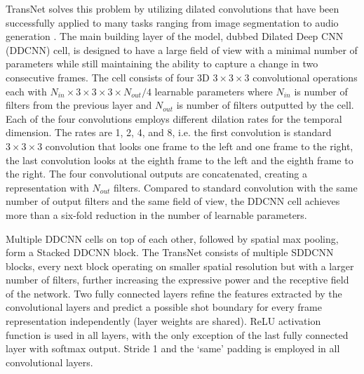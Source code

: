 TransNet solves this problem by utilizing dilated convolutions that have been successfully applied to many tasks ranging from image segmentation \cite{yu2015multi} to audio generation \cite{WaveNet}. The main building layer of the model, dubbed Dilated Deep CNN (DDCNN) cell, is designed to have a large field of view with a minimal number of parameters while still maintaining the ability to capture a change in two consecutive frames. The cell consists of four 3D $3\times3\times3$ convolutional operations each with $N_{in}\times 3\times 3\times 3\times N_{out} / 4$ learnable parameters where $N_{in}$ is number of filters from the previous layer and $N_{out}$ is number of filters outputted by the cell. Each of the four convolutions employs different dilation rates for the temporal dimension. The rates are 1, 2, 4, and 8, i.e. the first convolution is standard $3\times3\times3$ convolution that looks one frame to the left and one frame to the right, the last convolution looks at the eighth frame to the left and the eighth frame to the right.
The four convolutional outputs are concatenated, creating a representation with $N_{out}$ filters. Compared to standard convolution with the same number of output filters and the same field of view, the DDCNN cell achieves more than a six-fold reduction in the number of learnable parameters.

Multiple DDCNN cells on top of each other, followed by spatial max pooling, form a Stacked DDCNN block. The TransNet consists of multiple SDDCNN blocks, every next block operating on smaller spatial resolution but with a larger number of filters, further increasing the expressive power and the receptive field of the network.
Two fully connected layers refine the features extracted by the convolutional layers and predict a possible shot boundary for every frame representation independently (layer weights are shared). ReLU activation function is used in all layers, with the only exception of the last fully connected layer with softmax output. Stride 1 and the `same' padding is employed in all convolutional layers.


